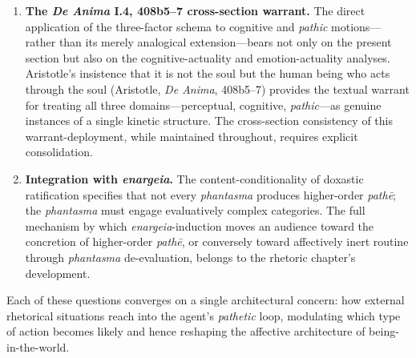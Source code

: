 \begin{enumerate}
respect to our human being-in-the-world'' will anchor the analysis of \textit{Mitsein}-mediated persuasion. \item \textbf{The \textit{De Anima} I.4, 408b5--7 cross-section warrant.} The direct application of the three-factor schema to cognitive and \textit{pathic} motions---rather than its merely analogical extension---bears not only on the present section but also on the cognitive-actuality and emotion-actuality analyses. Aristotle's insistence that it is not the soul but the human being who acts through the soul (Aristotle, \textit{De Anima}, 408b5--7) provides the textual warrant for treating all three domains---perceptual, cognitive, \textit{pathic}---as genuine instances of a single kinetic structure. The cross-section consistency of this warrant-deployment, while maintained throughout, requires explicit consolidation. \item \textbf{Integration with \textit{enargeia}.} The content-conditionality of doxastic ratification specifies that not every \textit{phantasma} produces higher-order \textit{pathē}; the \textit{phantasma} must engage evaluatively complex categories. The full mechanism by which \textit{enargeia}-induction moves an audience toward the concretion of higher-order \textit{pathē}, or conversely toward affectively inert routine through \textit{phantasma} de-evaluation, belongs to the rhetoric chapter's development. \end{enumerate}

Each of these questions converges on a single architectural concern: how external rhetorical situations reach into the agent's \textit{pathetic} loop, modulating which type of action becomes likely and hence reshaping the affective architecture of being-in-the-world.


